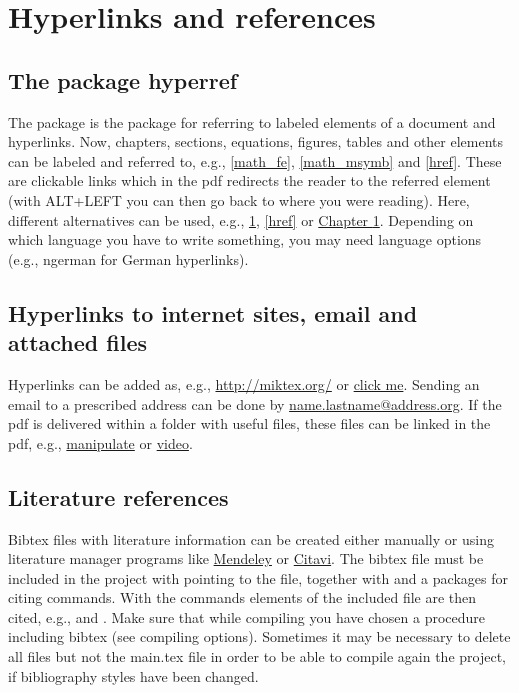 \chapter{Hyperlinks and references}
\label{href}


\section{The package hyperref}

The package  is the package for referring to labeled elements of a document and hyperlinks. Now, chapters, sections, equations, figures, tables and other elements can be labeled and referred to, e.g., \autoref{math_fe}, \autoref{math_msymb} and \autoref{href}. These are clickable links which in the pdf redirects the reader to the referred element (with ALT+LEFT you can then go back to where you were reading). Here, different alternatives can be used, e.g., \ref{href}, \autoref{href} or \hyperref[href]{Chapter \ref*{href}}. Depending on which language you have to write something, you may need language options (e.g., ngerman for German hyperlinks).


\section{Hyperlinks to internet sites, email and attached files}

Hyperlinks can be added as, e.g., \url{http://miktex.org/} or \href{http://miktex.org/}{click me}. Sending an email to a prescribed address can be done by \href{mailto:name.lastname@address.org}{name.lastname@address.org}. If the pdf is delivered within a folder with useful files, these files can be linked in the pdf, e.g., \href{run:attachments/manipulate.nb}{manipulate} or \href{run:attachments/video.mp4}{video}.


\section{Literature references}

Bibtex files with literature information can be created either manually or using literature manager programs like \href{http://www.mendeley.com/}{Mendeley} or \href{http://citavi.com/en/index.html}{Citavi}. The bibtex file must be included in the project with  pointing to the file, together with  and a packages for citing commands. With the commands  elements of the included file are then cited, e.g., \cite{Hill1952} and \citep{Kroner1977}. Make sure that while compiling you have chosen a procedure including bibtex (see compiling options). Sometimes it may be necessary to delete all files but not the main.tex file in order to be able to compile again the project, if bibliography styles have been changed.